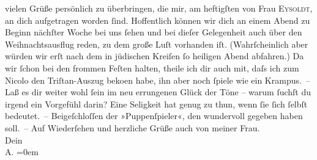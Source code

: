 \begin{ledgroupsized}[t]{13cm}
               vielen Grüße persönlich zu überbringen, die mir, am heftigſten von Frau \textsc{Eysoldt}, an dich aufgetragen worden ſind. Hoffentlich können wir dich an einem Abend zu
               Beginn nächſter Woche bei uns ſehen {\pb}und bei dieſer
               Gelegenheit auch über den Weihnachtsausflug reden, zu dem große Luſt vorhanden iſt.
               (Wahrſcheinlich aber würden wir erſt nach dem in jüdischen Kreiſen ſo heiligen Abend
               abfahren.) Da wir ſchon bei den frommen Feſten halten, theile ich dir auch mit, daſs
               ich zum Nicolo den Triſtan-Auszug beko{\geminationm}en habe, ihn aber {\pb}noch ſpiele wie ein
               Krampus. –\pend
           \pstart
           Laß es dir weiter wohl ſein im neu errungenen Glück der Töne – warum ſuchſt du irgend
               ein Vorgefühl darin? Eine Seligkeit hat genug 
               zu thun, wenn ſie ſich ſelbſt bedeutet. – \pend
           \pstart
           Beigeſchloſſen der »Puppenſpieler«, den \label{K_L01475_2v}\label{K_L01475_2h} wundervoll gegeben haben soll. –\pend
           \pstart
           Auf Wiederſehen und herzliche Grüße {\pb}auch von meiner Frau.{\\[\baselineskip]}Dein{\\[\baselineskip]}\spacefill\mbox{A.}\pend
           \leftskip=0em{}\endnumbering{}\end{ledgroupsized}  \newcommand{\dateiname}{L01475}\newcommand{\titel}{Arthur Schnitzler an Hermann Bahr, 5. 12. 1904}\newcommand{\editorInnen}{ Kurt Ifkovits,  Martin Anton Müller}
      